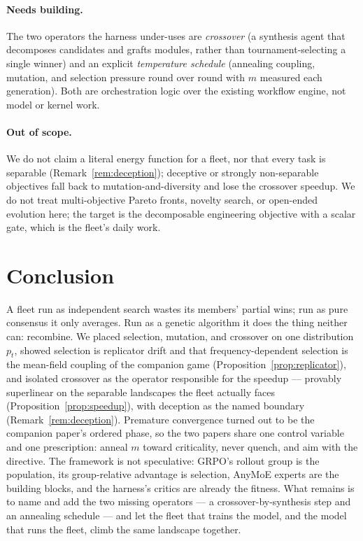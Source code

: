 \documentclass[11pt]{article}
\begin{document}
\paragraph{Needs building.} The two operators the harness under-uses are \emph{crossover} (a synthesis agent
that decomposes candidates and grafts modules, rather than tournament-selecting a single winner) and an
explicit \emph{temperature schedule} (annealing coupling, mutation, and selection pressure round over round
with $m$ measured each generation). Both are orchestration logic over the existing workflow engine, not model
or kernel work.

\paragraph{Out of scope.} We do not claim a literal energy function for a fleet, nor that every task is
separable (Remark~\ref{rem:deception}); deceptive or strongly non-separable objectives fall back to
mutation-and-diversity and lose the crossover speedup. We do not treat multi-objective Pareto fronts, novelty
search, or open-ended evolution here; the target is the decomposable engineering objective with a scalar
gate, which is the fleet's daily work.

\section{Conclusion}
\label{sec:conclusion}

A fleet run as independent search wastes its members' partial wins; run as pure consensus it only averages.
Run as a genetic algorithm it does the thing neither can: recombine. We placed selection, mutation, and
crossover on one distribution $p_t$, showed selection is replicator drift and that frequency-dependent
selection is the mean-field coupling of the companion game (Proposition~\ref{prop:replicator}), and isolated
crossover as the operator responsible for the speedup --- provably superlinear on the separable landscapes the
fleet actually faces (Proposition~\ref{prop:speedup}), with deception as the named boundary
(Remark~\ref{rem:deception}). Premature convergence turned out to be the companion paper's ordered phase, so
the two papers share one control variable and one prescription: anneal $m$ toward criticality, never quench,
and aim with the directive. The framework is not speculative: GRPO's rollout group is the population, its
group-relative advantage is selection, AnyMoE experts are the building blocks, and the harness's critics are
already the fitness. What remains is to name and add the two missing operators --- a crossover-by-synthesis
step and an annealing schedule --- and let the fleet that trains the model, and the model that runs the fleet,
climb the same landscape together.
\end{document}
